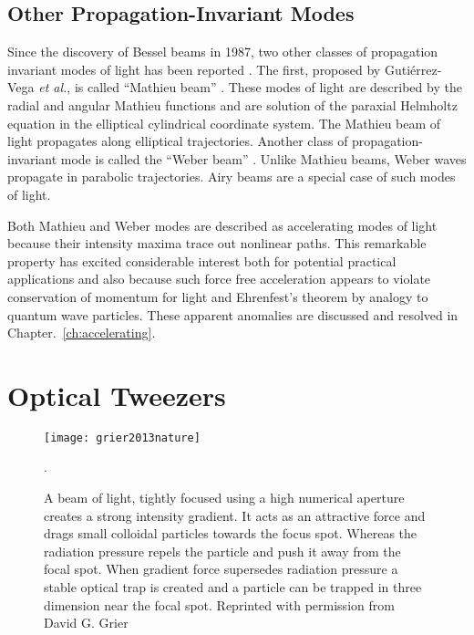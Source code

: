 \subsection{Other Propagation-Invariant Modes}

Since the discovery of Bessel beams in 1987, two other classes of propagation invariant modes of light has been reported \cite{LEVY2016237,Bandres04}. The first, proposed by Gutiérrez-Vega \emph{et al.}, is called ``Mathieu beam'' \cite{GutierrezVega00}.  These modes of light are described by the radial and angular Mathieu functions and are solution of the paraxial Helmholtz equation in the elliptical cylindrical coordinate system. The Mathieu beam of light propagates along elliptical trajectories. Another class of propagation-invariant mode is called the ``Weber beam'' \cite{Bandres_2013,RodriguezLara10}. Unlike Mathieu beams, Weber waves propagate in parabolic trajectories. Airy beams are a special case of such modes of light.

Both Mathieu and Weber modes are described as accelerating modes of light because their intensity maxima trace out nonlinear paths. This remarkable property has excited considerable interest both for potential practical applications and also because such force free acceleration appears to violate conservation of momentum for light and Ehrenfest's theorem by analogy to quantum wave particles. These apparent anomalies are discussed and resolved in Chapter.~\ref{ch:accelerating}.

\section{Optical Tweezers}
\begin{figure}[t!]
  \centering
  \texttt{[image: grier2013nature]}
  \caption{A beam of light, tightly focused using a high numerical aperture creates a strong intensity gradient. It acts as an attractive force and drags small colloidal particles towards the focus spot. Whereas the radiation pressure repels the particle and push it away from the focal spot. When gradient force supersedes radiation pressure a stable optical trap is created and a particle can be trapped in three dimension near the focal spot. Reprinted with permission from David G. Grier \cite{grier2003nature}}.
  \label{fig:Optical tweezers}
\end{figure}

